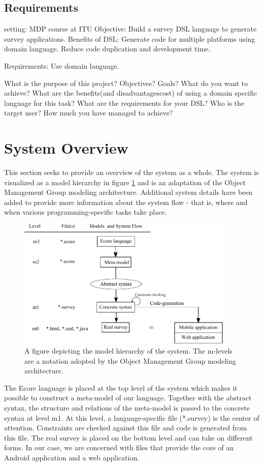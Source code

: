 \documentclass[runningheads]{llncs}
\begin{document}
\subsection{Requirements}

setting: MDP course at ITU
Objective: Build a survey DSL language to generate survey applications.
Benefits of DSL: Generate code for multiple platforms using domain language. Reduce code duplication and development time.

Requirements: Use domain language. 



What is the purpose of this project?
Objectives? Goals? What do you want to achieve?
What are the benefits(and disadvantages\/cost) of using a domain
specific language for this task?
What are the requirements for your DSL? Who is the target user?
How much you have managed to achieve?

\section{System Overview}
This section seeks to provide an overview of the system as a whole. The system is visualized as a model hierarchy in figure \ref{fig:mhier} and is an adaptation of the Object Management Group\cite{omg} modeling architecture. Additional system details have been added to provide more information about the system flow - that is, where and when various programming-specific tasks take place.
\begin{figure}
\centering
\includegraphics[height=6.2cm]{modelhierarchy}
\caption{A figure depicting the model hierarchy of the system. The m-levels are a notation adopted by the Object Management Group\cite{omg} modeling architecture.}
\label{fig:mhier}
\end{figure}
The Ecore language is placed at the top level of the system which makes it possible to construct a meta-model of our language. Together with the abstract syntax, the structure and relations of the meta-model is passed to the concrete syntax at level m1. At this level, a language-specific file (*.survey) is the center of attention. Constraints are checked against this file and code is generated from this file. The real survey is placed on the bottom level and can take on different forms. In our case, we are concerned with files that provide the core of an Android application and a web application.
\end{document}
